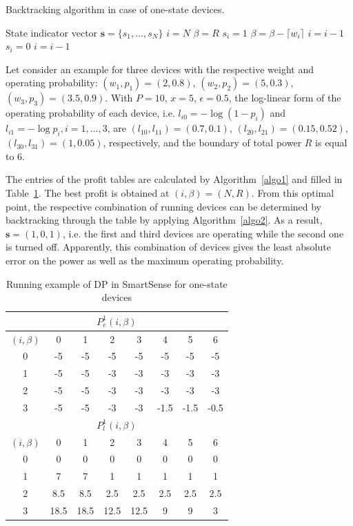 \begin{algorithm}
\caption{Backtracking algorithm in case of one-state devices.}
\label{algo2}
\begin{algorithmic}[1]
\Ensure State indicator vector $\mathbf{s} = \{s_1,\ldots,s_N\}$ 
\State $i = N$
\State $\beta =  R $
\State $s_i = 1$
\State $\beta = \beta-\lceil w_i \rceil $
\State $i = i-1$
\Else
\State $s_i=0$
\State $i = i-1$
\EndIf
\EndWhile
\end{algorithmic}
\end{algorithm}

Let consider an example for three devices with the respective weight and operating probability: $(w_1,p_1) = (2,0.8)$, $(w_2,p_2) = (5,0.3)$, $(w_3,p_3) = (3.5,0.9)$.
With $P = 10$, $x = 5$, $\epsilon=0.5$, the log-linear form of the operating probability of each device, i.e. $l_{i0} = -\log{(1-p_i)}$ and $l_{i1} = -\log{p_i},i = 1,\ldots,3$, are $(l_{10},l_{11})=(0.7,0.1)$, $(l_{20},l_{21})=(0.15,0.52)$, $(l_{30},l_{31})=(1,0.05)$, respectively, and the boundary of total power $R$ is equal to 6.

The entries of the profit tables are calculated by Algorithm~\ref{algo1} and filled in Table~\ref{table:DP1}. The best profit is obtained at $(i,\beta)=(N,R)$. From this optimal point, the respective combination of running devices can be determined by backtracking through the table by applying Algorithm~\ref{algo2}. As a result, $\mathbf{s} = (1,0,1)$, i.e. the first and third devices are operating while the second one is turned off. Apparently, this combination of devices gives the least absolute error on the power as well as the maximum operating probability.

\begin{table}
\caption{Running example of DP in SmartSense for one-state devices}\label{table:DP1}
\begin{center}
\begin{tabular}{|c|c|c|c|c|c|c|c|}
\hline
\multicolumn{8}{|c|}{$P^1_e(i,\beta)$}\\ \hline 
$(i,\beta)$&0&1&2&3&4&5&6\\ \hline
0&-5&-5&-5&-5&-5&-5&-5 \\ \hline
1&-5&-5&-3&-3&-3&-3&-3 \\ \hline
2&-5&-5&-3&-3&-3&-3&-3 \\ \hline
3&-5&-5&-3&-3&-1.5&-1.5&-0.5 \\ \hline
\multicolumn{8}{|c|}{$P^1_l(i,\beta)$}\\ \hline 
$(i,\beta)$&0&1&2&3&4&5&6\\ \hline
0&0&0&0&0&0&0&0 \\ \hline
1&7&7&1&1&1&1&1\\ \hline
2&8.5&8.5&2.5&2.5&2.5&2.5&2.5\\ \hline
3&18.5&18.5&12.5&12.5&9&9&3\\ \hline
\end{tabular}
\end{center}
\end{table}




